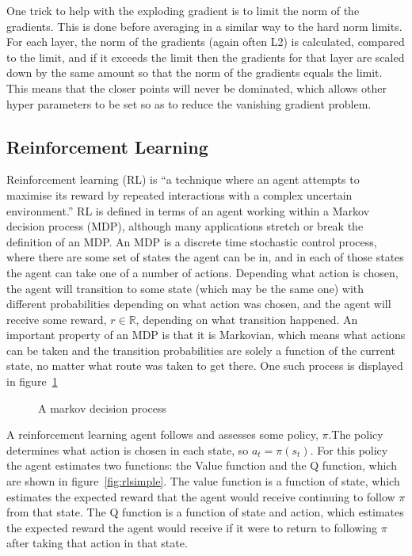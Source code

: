 One trick to help with the exploding gradient is to limit the norm of the gradients. This is done before averaging in a similar way to the hard norm limits. For each layer, the norm of the gradients (again often L2) is calculated, compared to the limit, and if it exceeds the limit then the gradients for that layer are scaled down by the same amount so that the norm of the gradients equals the limit. This means that the closer points will never be dominated, which allows other hyper parameters to be set so as to reduce the vanishing gradient problem.

\subsection{Reinforcement Learning}

Reinforcement learning (RL) is ``a technique where an agent attempts to maximise its reward by repeated interactions with a complex uncertain environment.'' \cite{Sutton:1998:IRL:551283}
RL is defined in terms of an agent working within a Markov decision process (MDP), although many applications stretch or break the definition of an MDP. An MDP is a discrete time stochastic control process, where there are some set of states the agent can be in, and in each of those states the agent can take one of a number of actions. Depending what action is chosen, the agent will transition to some state (which may be the same one) with different probabilities depending on what action was chosen, and the agent will receive some reward, $r \in \mathbb{R}$, depending on what transition happened. An important property of an MDP is that it is Markovian, which means what actions can be taken and the transition probabilities are solely a function of the current state, no matter what route was taken to get there. One such process is displayed in figure~\ref{fig:mdpsimple}

\begin{figure}
\centering

\caption{A markov decision process}
\label{fig:mdpsimple}
\end{figure}

A reinforcement learning agent follows and assesses some policy, $\pi$.The policy determines what action is chosen in each state, so $a_t = \pi(s_t)$. For this policy the agent estimates two functions: the Value function and the Q function, which are shown in figure~\ref{fig:rlsimple}.  The value function is a function of state, which estimates the expected reward that the agent would receive continuing to follow $\pi$ from that state. The Q function is a function of state and action, which estimates  the expected reward the agent would receive if it were to return to following $\pi$ after taking that action in that state.

